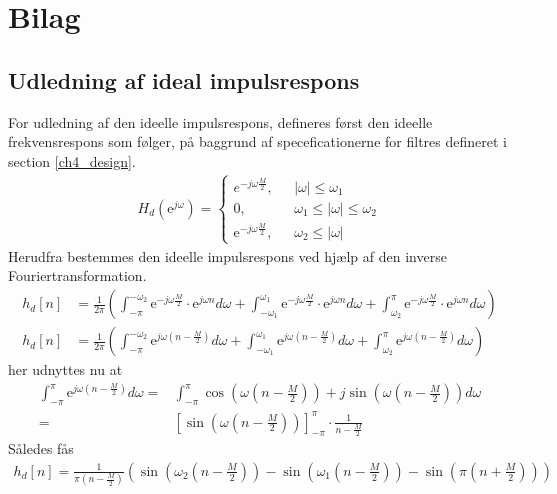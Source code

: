 \chapter{Bilag}
\section{Udledning af ideal impulsrespons}
For udledning af den ideelle impulsrespons, defineres først den ideelle frekvensrespons som følger, på baggrund af speceficationerne for filtres defineret i section \ref{ch4_design}.
\begin{align}
 H_d(\text{e}^{j\omega})= \begin{cases}
  {e}^{-j\omega\frac{M}{2}}, \ \ \ & |\omega| \leq\omega_1 \\
 0, \ \ \ & \omega_1 \leq |\omega| \leq \omega_2 \\
  \text{e}^{-j\omega\frac{M}{2}}, \ \ \ & \omega_2 \leq |\omega| 
\end{cases}
\end{align}  
Herudfra bestemmes den ideelle impulsrespons ved hjælp af den inverse Fouriertransformation.  
\begin{align}
h_d[n] &= \frac{1}{2\pi} \left(  \int_{-\pi}^{-\omega_2} \text{e}^{-j\omega \frac{M}{2}} \cdot \text{e}^{j \omega n} d\omega + \int_{-\omega_1}^{\omega_1} \text{e}^{-j\omega \frac{M}{2}} \cdot \text{e}^{j \omega n} d\omega +\int_{\omega_2}^{\pi} \text{e}^{-j\omega \frac{M}{2}} \cdot \text{e}^{j \omega n} d\omega	\right) \\
h_d[n] &= \frac{1}{2\pi} \left(  \int_{-\pi}^{-\omega_2} \text{e}^{j\omega \left(n- \frac{M}{2} \right) } d\omega + \int_{-\omega_1}^{\omega_1} \text{e}^{j\omega \left(n- \frac{M}{2} \right) }  d\omega +\int_{\omega_2}^{\pi} \text{e}^{j\omega \left( n-\frac{M}{2} \right) } d\omega	\right)
\end{align} 
her udnyttes nu at
\begin{align}
\int_{-\pi}^{\pi} \text{e}^{j\omega \left(n- \frac{M}{2} \right) }  d\omega =& \int_{-\pi}^{\pi} \cos\left( \omega \left(n-\frac{M}{2}\right)\right)+j \sin \left( \omega \left(n-\frac{M}{2}\right) \right) d\omega \\
=& \left[ \sin\left(\omega \left(n-\frac{M}{2}\right)\right) \right]_{-\pi}^{\pi} \cdot \frac{1}{n- \frac{M}{2}}
\end{align}    
Således fås 
\begin{align}
h_d[n]= \frac{1}{\pi \left(n-\frac{M}{2}\right)} \left(\sin\left(\omega_2 \left(n-\frac{M}{2}\right)\right) - \sin\left(\omega_1 \left(n-\frac{M}{2}\right)\right) - \sin\left( \pi\left( n + \frac{M}{2} \right) \right) \right)
\end{align}
